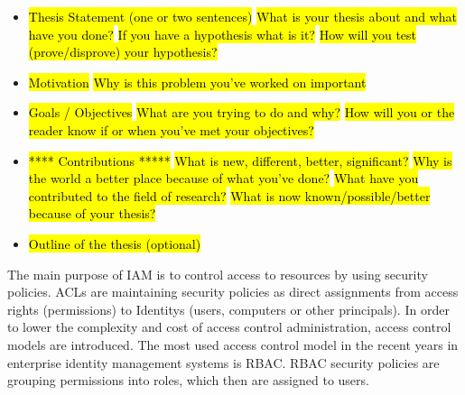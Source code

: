\begin{itemize}
    \item \hl{Thesis Statement (one or two sentences)}
        \subitem \hl{What is your thesis about and what have you done?}
        \subitem \hl{If you have a hypothesis what is it?}
        \subitem \hl{How will you test (prove/disprove) your hypothesis?}
    \item \hl{Motivation}
        \subitem \hl{Why is this problem you've worked on important}
    \item \hl{Goals / Objectives}
        \subitem \hl{What are you trying to do and why?}
        \subitem \hl{How will you or the reader know if or when you've met your objectives?}
    \item \hl{**** Contributions *****}
        \subitem \hl{What is new, different, better, significant?}
        \subitem \hl{Why is the world a better place because of what you've done?}
        \subitem \hl{What have you contributed to the field of research?}
        \subitem \hl{What is now known/possible/better because of your thesis?}
    \item \hl{Outline of the thesis (optional)}
\end{itemize}
\fi

\iffalse
The main purpose of \gls{IAM} is to control access to resources by using security policies. \glspl{ACL} are maintaining security policies as direct assignments from access rights (permissions) to \glspl{Identity} (users, computers or other principals). In order to lower the complexity and cost of access control administration, access control models are introduced. The most used access control model in the recent years in enterprise identity management systems is \gls{RBAC}. \cite{Kunz} \gls{RBAC} security policies are grouping permissions into roles, which then are assigned to users.\\

\iffalse
Role-based access control (RBAC) is the most used access control model in enterprise identity management systems nowadays \cite{Kunz} due to the advantage to lower the complexity and cost of access control administration. But also Attribute-based access control (ABAC) is getting more popular due to its higher flexibility. Both access control models have their advantages and disadvantages. \cite{Hu13guideto} \cite{Coyne:2013}\\
\fi 

\iffalse
Access Control Lists (ACL) are maintaining security policies, which can be represented as tuples <U,P,UP>. Here, U is representing a set of users (identities), P denotes a set of permissions (access rights) and UP ⊆ U × P denotes a user-permission assignment.
In RBAC security policies are defined by tuples <U,P,R,UR,RP,RR>. \cite{DuChang}
\fi

